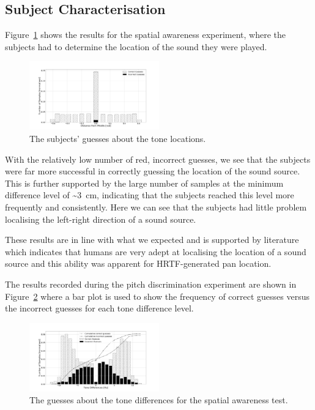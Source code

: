 \documentclass[format=sigconf, review=true, screen=true, anonymous=true]{acmart}
\begin{document}
\subsection{Subject Characterisation}

Figure~\ref{fig:location-guesses} shows the results for the spatial awareness experiment, where the subjects had to determine the location of the sound they were played. 

\begin{figure}
  \centering
  \includegraphics[width=0.5\textwidth]{figures/location_guesses.png}
  \caption{The subjects' guesses about the tone locations.}
  \label{fig:location-guesses}
\end{figure}

With the relatively low number of red, incorrect guesses, we see that the subjects were far more successful in correctly guessing the location of the sound source. This is further supported by the large number of samples at the minimum difference level of \textasciitilde\SI{3}{\cm}, indicating that the subjects reached this level more frequently and consistently. Here we can see that the subjects had little problem localising the left-right direction of a sound source. 

These results are in line with what we expected and is supported by literature which indicates that humans are very adept at localising the location of a sound source and this ability was apparent for HRTF-generated pan location. 

The results recorded during the pitch discrimination experiment are shown in Figure~\ref{fig:tone-guesses} where a bar plot is used to show the frequency of correct guesses versus the incorrect guesses for each tone difference level. 

\begin{figure}
  \centering
  \includegraphics[width=0.5\textwidth]{figures/tone_guesses.png}
  \caption{The guesses about the tone differences for the spatial awareness test.}
  \label{fig:tone-guesses}
\end{figure}
\end{document}
